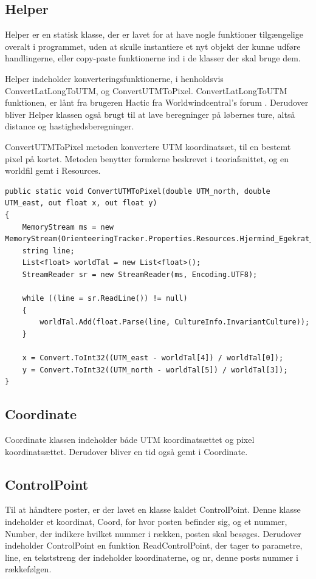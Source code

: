 \subsection{Helper}
Helper er en statisk klasse, der er lavet for at have nogle funktioner tilgængelige overalt i programmet, uden at skulle instantiere et nyt objekt der kunne udføre handlingerne, eller copy-paste funktionerne ind i de klasser der skal bruge dem. 

Helper indeholder konverteringsfunktionerne, i henholdsvis ConvertLatLongToUTM, og ConvertUTMToPixel. ConvertLatLongToUTM funktionen, er lånt fra brugeren Hactic fra Worldwindcentral's forum \citep{UTM}.
Derudover bliver Helper klassen også brugt til at lave beregninger på løbernes ture, altså distance og hastighedsberegninger.
 
ConvertUTMToPixel metoden konvertere UTM koordinatsæt, til en bestemt pixel på kortet. Metoden benytter formlerne beskrevet i teoriafsnittet, og en worldfil gemt i Resources.

\begin{lstlisting}
public static void ConvertUTMToPixel(double UTM_north, double UTM_east, out float x, out float y)
{
    MemoryStream ms = new MemoryStream(OrienteeringTracker.Properties.Resources.Hjermind_Egekrat_ref_ref1);
    string line;
    List<float> worldTal = new List<float>();
    StreamReader sr = new StreamReader(ms, Encoding.UTF8);

    while ((line = sr.ReadLine()) != null)
    {
        worldTal.Add(float.Parse(line, CultureInfo.InvariantCulture));
    }

    x = Convert.ToInt32((UTM_east - worldTal[4]) / worldTal[0]);
    y = Convert.ToInt32((UTM_north - worldTal[5]) / worldTal[3]);
}
\end{lstlisting}

\subsection{Coordinate}
Coordinate klassen indeholder både UTM koordinatsættet og pixel koordinatsættet. Derudover bliver en tid også gemt i Coordinate.

\subsection{ControlPoint}
Til at håndtere poster, er der lavet en klasse kaldet ControlPoint. Denne klasse indeholder et koordinat, Coord, for hvor posten befinder sig, og et nummer, Number, der indikere hvilket nummer i rækken, posten skal besøges. 
Derudover indeholder ControlPoint en funktion ReadControlPoint, der tager to parametre, line, en tekststreng der indeholder koordinaterne, og nr, denne posts nummer i rækkefølgen. 

